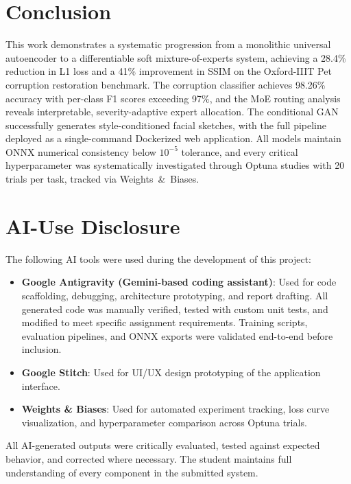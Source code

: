 \documentclass[conference]{IEEEtran}
\begin{document}
\section{Conclusion}
\label{sec:conclusion}

This work demonstrates a systematic progression from a monolithic universal autoencoder to a differentiable soft mixture-of-experts system, achieving a 28.4\% reduction in L1 loss and a 41\% improvement in SSIM on the Oxford-IIIT Pet corruption restoration benchmark. The corruption classifier achieves 98.26\% accuracy with per-class F1 scores exceeding 97\%, and the MoE routing analysis reveals interpretable, severity-adaptive expert allocation. The conditional GAN successfully generates style-conditioned facial sketches, with the full pipeline deployed as a single-command Dockerized web application. All models maintain ONNX numerical consistency below $10^{-5}$ tolerance, and every critical hyperparameter was systematically investigated through Optuna studies with 20 trials per task, tracked via Weights~\&~Biases.

\appendices

\section{AI-Use Disclosure}
\label{appendix:ai}

The following AI tools were used during the development of this project:

\begin{itemize}
    \item \textbf{Google Antigravity (Gemini-based coding assistant)}: Used for code scaffolding, debugging, architecture prototyping, and report drafting. All generated code was manually verified, tested with custom unit tests, and modified to meet specific assignment requirements. Training scripts, evaluation pipelines, and ONNX exports were validated end-to-end before inclusion.
    \item \textbf{Google Stitch}: Used for UI/UX design prototyping of the application interface.
    \item \textbf{Weights \& Biases}: Used for automated experiment tracking, loss curve visualization, and hyperparameter comparison across Optuna trials.
\end{itemize}

All AI-generated outputs were critically evaluated, tested against expected behavior, and corrected where necessary. The student maintains full understanding of every component in the submitted system.
\end{document}
